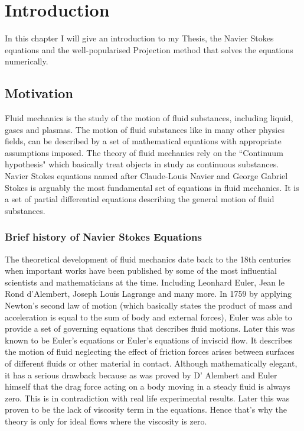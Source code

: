 
\chapter{Introduction}
\label{chapter1}
In this chapter I will give an introduction to my Thesis, the Navier Stokes equations and the well-popularised Projection method that solves the equations numerically.

\section{Motivation}
Fluid mechanics is the study of the motion of fluid substances, including liquid, gases and plasmas. The motion of fluid substances like in many other physics fields, can be described by a set of mathematical equations with appropriate assumptions imposed. The theory of fluid mechanics rely on the ``Continuum hypothesis" which basically treat objects in study as continuous substances. Navier Stokes equations named after Claude-Louis Navier and George Gabriel Stokes is arguably the most fundamental set of equations in fluid mechanics. It is a set of partial differential equations describing the general motion of fluid substances.\\

\subsection{Brief history of Navier Stokes Equations}
The theoretical development of fluid mechanics date back to the 18th centuries when important works have been published by some of the most influential scientists and mathematicians at the time. Including Leonhard Euler, Jean le Rond d'Alembert, Joseph Louis Lagrange and many more. In 1759 by applying Newton's second law of motion (which basically states the product of mass and acceleration is equal to the sum of body and external forces), Euler was able to provide a set of governing equations that describes fluid motions. Later this was known to be Euler's equations or Euler's equations of inviscid flow. It describes the motion of fluid neglecting the effect of friction forces arises between surfaces of different fluids or other material in contact. Although mathematically elegant, it has a serious drawback because as was proved by D' Alembert and Euler himself that the drag force acting on a body moving in a steady fluid is always zero. This is in contradiction with real life experimental results. Later this was proven to be the lack of viscosity term in the equations. Hence that's why the theory is only for ideal flows where the viscosity is zero. \\

